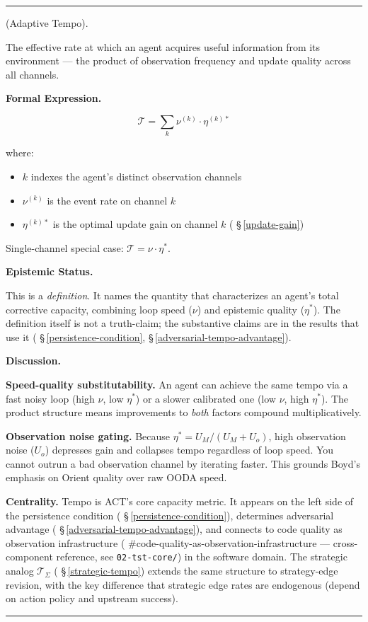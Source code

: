 \documentclass[11pt,oneside]{article}
\newcounter{claim}[section]
\renewcommand{\theclaim}{\thesection.\arabic{claim}}
\newenvironment{segment}[2]{%
  \refstepcounter{claim}%
  \bigskip\noindent\hrule\smallskip
  \noindent{\bfseries #1~\theclaim}\enskip(#2).\par\smallskip
  \noindent\ignorespaces
}{%
  \par\smallskip\noindent\hrule\bigskip
}
\newenvironment{definition}[1][]{\begin{segment}{Definition}{#1}}{\end{segment}}
\begin{document}
\begin{definition}[Adaptive Tempo]
\label{adaptive-tempo}
The effective rate at which an agent acquires useful information from its environment — the product of observation frequency and update quality across all channels.



\medskip\noindent\textbf{Formal Expression.}



$$\mathcal{T} = \sum_k \nu^{(k)} \cdot \eta^{(k)*}$$

where:
\begin{itemize}
  \item $k$ indexes the agent's distinct observation channels
  \item $\nu^{(k)}$ is the event rate on channel $k$
  \item $\eta^{(k)*}$ is the optimal update gain on channel $k$ ( \S\,\ref{update-gain})
\end{itemize}


Single-channel special case: $\mathcal{T} = \nu \cdot \eta^*$.


\medskip\noindent\textbf{Epistemic Status.}


This is a \textit{definition}. It names the quantity that characterizes an agent's total corrective capacity, combining loop speed ($\nu$) and epistemic quality ($\eta^*$). The definition itself is not a truth-claim; the substantive claims are in the results that use it ( \S\,\ref{persistence-condition}, \S\,\ref{adversarial-tempo-advantage}).


\medskip\noindent\textbf{Discussion.}


\textbf{Speed-quality substitutability.} An agent can achieve the same tempo via a fast noisy loop (high $\nu$, low $\eta^*$) or a slower calibrated one (low $\nu$, high $\eta^*$). The product structure means improvements to \textit{both} factors compound multiplicatively.

\textbf{Observation noise gating.} Because $\eta^* = U_M / (U_M + U_o)$, high observation noise ($U_o$) depresses gain and collapses tempo regardless of loop speed. You cannot outrun a bad observation channel by iterating faster. This grounds Boyd's emphasis on Orient quality over raw OODA speed.

\textbf{Centrality.} Tempo is ACT's core capacity metric. It appears on the left side of the persistence condition ( \S\,\ref{persistence-condition}), determines adversarial advantage ( \S\,\ref{adversarial-tempo-advantage}), and connects to code quality as observation infrastructure ( \#code-quality-as-observation-infrastructure — cross-component reference, see \texttt{02-tst-core/}) in the software domain. The strategic analog $\mathcal{T}_\Sigma$ ( \S\,\ref{strategic-tempo}) extends the same structure to strategy-edge revision, with the key difference that strategic edge rates are endogenous (depend on action policy and upstream success).


\end{definition}
\end{document}
